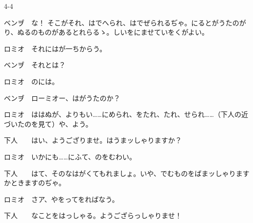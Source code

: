 \documentclass[tate,paper=b6j,jafontsize=9pt]{jlreq}
\begin{document}
\begin{azconvIndented}{4\zw}{-4\zw}

ベンヺ　な！ そこがそれ、はでへられ、はでぜられるぢゃ。にるとがうたのがり、ぬるのものがあるとれらるゝ。しいをにませていをくがよい。

ロミオ　それにはが一ちからう。

ベンヺ　それとは？

ロミオ　のには。

ベンヺ　ローミオー、はがうたのか？

ロミオ　ははぬが、よりもい……にめられ、をたれ、たれ、せられ……（下人の近づいたのを見て）や、よう。

下人　　はい、ようござりませ。はうまッしゃりますか？

ロミオ　いかにも……にふて、のをむわい。

下人　　はて、そのなはがくてもれましょ。いや、でむものをばまッしゃりますかときますのぢゃ。

ロミオ　さア、やをってをればなう。

下人　　なことをはっしゃる。ようござらっしゃりませ！

\end{azconvIndented}
\end{document}
